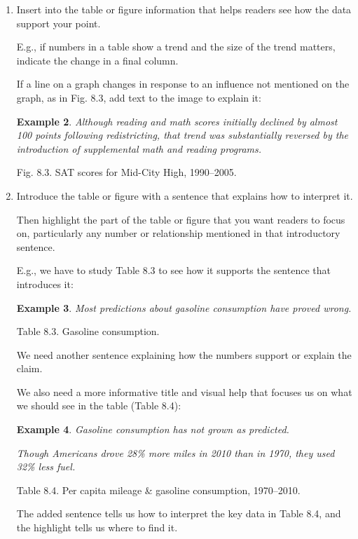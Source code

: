 \documentclass[oneside]{book}
\numberwithin{equation}{section}
\newtheorem{example}{Example}[section]
\begin{document}
\begin{enumerate}
\begin{itemize}
\begin{example}
            But: Risk factors for high blood pressure among men in Maywood, Illinois
            
            Or: Risk factors for high blood pressure among men in Kingston, Jamaica
        \end{example}
    \end{itemize}
    \item Insert into the table or figure information that helps readers see how the data support your point.
    
    E.g., if numbers in a table show a trend and the size of the trend matters, indicate the change in a final column.
    
    If a line on a graph changes in response to an influence not mentioned on the graph, as in Fig. 8.3, add text to the image to explain it:
    \begin{example}
        Although reading and math scores initially declined by almost 100 points following redistricting, that trend was substantially reversed by the introduction of supplemental math and reading programs.
    \end{example}
    \textsf{Fig. 8.3. SAT scores for Mid-City High, 1990--2005.}
    \item Introduce the table or figure with a sentence that explains how to interpret it.
    
    Then highlight the part of the table or figure that you want readers to focus on, particularly any number or relationship mentioned in that introductory sentence.
    
    E.g., we have to study Table 8.3 to see how it supports the sentence that introduces it:
    \begin{example}
        Most predictions about gasoline consumption have proved wrong.
    \end{example}
    \textsf{Table 8.3. Gasoline consumption.}
    
    We need another sentence explaining how the numbers support or explain the claim.
    
    We also need a more informative title and visual help that focuses us on what we should see in the table (Table 8.4):
    \begin{example}
        Gasoline consumption has not grown as predicted.
        
        Though Americans drove 28\% more miles in 2010 than in 1970, they used 32\% less fuel.
    \end{example}
    \textsf{Table 8.4. Per capita mileage \& gasoline consumption, 1970--2010.}
    
    The added sentence tells us how to interpret the key data in Table 8.4, and the highlight tells us where to find it.
\end{enumerate}
\end{document}

